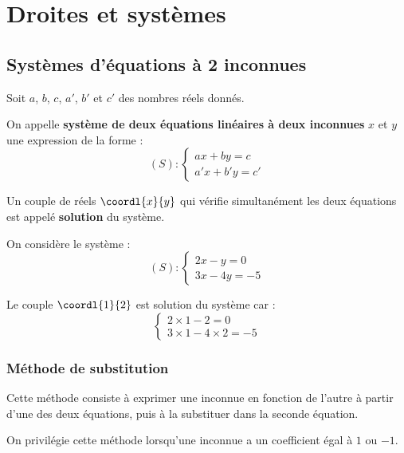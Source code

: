 \chapter{Droites et systèmes}

\section{Systèmes d'équations à 2 inconnues}

\begin{df}
	Soit $a$, $b$, $c$, $a'$, $b'$ et $c'$ des nombres réels donnés.

	On appelle \textbf{système de deux équations linéaires à deux inconnues} $x$ et $y$ une expression de la forme :
	\[
		(S):\begin{cases}
			ax + by = c \\
			a'x + b'y = c'
		\end{cases}
	\]

	Un couple de réels $\coordl{x}{y}$ qui vérifie simultanément les deux équations est appelé \textbf{solution} du système.
\end{df}

\begin{ex}
	On considère le système :
	\[
		(S):\begin{cases}
			2x - y = 0 \\
			3x - 4y = -5
		\end{cases}
	\]

	Le couple $\coordl{1}{2}$ est solution du système car :
	\[
		\begin{cases}
			2 \times 1 - 2 = 0 \\
			3 \times 1 - 4 \times 2 = -5
		\end{cases}
	\]
\end{ex}

\subsection{Méthode de substitution}

\begin{methode}
	Cette méthode consiste à exprimer une inconnue en fonction de l'autre à partir d'une des deux équations, puis à la substituer dans la seconde équation.

	On privilégie cette méthode lorsqu'une inconnue a un coefficient égal à $1$ ou $-1$.
\end{methode}

